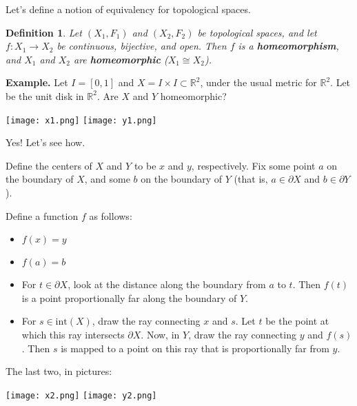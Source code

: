 \documentclass[11pt]{amsart}
\newtheorem*{defn}{Definition}
\newcommand{\ex}{ {\bf Example.} }
\newcommand{\R}{\mathbb R}
\begin{document}
Let's define a notion of equivalency for topological spaces.

\begin{defn}
Let $(X_1,F_1)$ and $(X_2,F_2)$ be topological spaces, and let $f:X_1\to X_2$ be continuous, bijective, and open.  Then $f$ is a {\bf homeomorphism}, and $X_1$ and $X_2$ are {\bf homeomorphic} ($X_1 \cong X_2$).
\end{defn}

\ex
Let $I = [0,1]$ and $X = I\times I\subset\R^2$, under the usual metric for $\R^2$.  Let \nobreak{$Y = \{ (x,y)\in\R^2 | x^2+y^2\le 1\} = D^2$} be the unit disk in $\R^2$.  Are $X$ and $Y$ homeomorphic?
\begin{center}
\texttt{[image: x1.png]}\qquad\quad \raisebox{50pt}{\Huge $\cong$} \qquad\quad\texttt{[image: y1.png]}\qquad\quad \raisebox{50pt}{\Huge ?}
\end{center}
Yes!  Let's see how. 

Define the centers of $X$ and $Y$ to be $x$ and $y$, respectively.  Fix some point $a$ on the boundary of $X$, and some $b$ on the boundary of $Y$ (that is, $a\in \partial X$ and $b\in\partial Y$).

Define a function $f$ as follows:
\begin{itemize}
\item $f(x) = y$
\item $f(a) = b$
\item For $t\in\partial X$, look at the distance along the boundary from $a$ to $t$.  Then $f(t)$ is a point proportionally far along the boundary of $Y$.
\item For $s\in \text{int}(X)$, draw the ray connecting $x$ and $s$.  Let $t$ be the point at which this ray intersects $\partial X$.  Now, in $Y$, draw the ray connecting $y$ and $f(s)$.  Then $s$ is mapped to a point on this ray that is proportionally far from $y$.
\end{itemize}
The last two, in pictures:
\begin{center}
\texttt{[image: x2.png]}\qquad\quad \raisebox{50pt}{\Huge $\longrightarrow$} \qquad\quad\texttt{[image: y2.png]}
\end{center}
\end{document}
